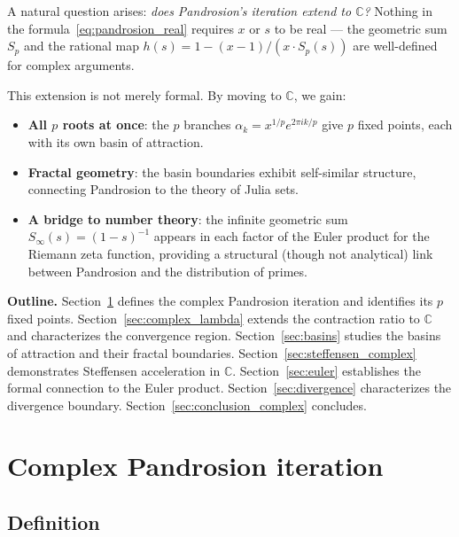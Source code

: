 \documentclass[11pt,a4paper]{article}
\theoremstyle{definition}
\newcommand{\CC}{\mathbb{C}}
\begin{document}
\medskip

A natural question arises: \emph{does Pandrosion's iteration extend to $\CC$?}  Nothing in the formula~\eqref{eq:pandrosion_real} requires $x$ or $s$ to be real --- the geometric sum $S_p$ and the rational map $h(s) = 1 - (x-1)/(x \cdot S_p(s))$ are well-defined for complex arguments.

\medskip

This extension is not merely formal.  By moving to $\CC$, we gain:
\begin{itemize}
  \item \textbf{All $p$ roots at once}: the $p$ branches $\alpha_k = x^{1/p} e^{2\pi ik/p}$ give $p$ fixed points, each with its own basin of attraction.
  \item \textbf{Fractal geometry}: the basin boundaries exhibit self-similar structure, connecting Pandrosion to the theory of Julia sets.
  \item \textbf{A bridge to number theory}: the infinite geometric sum $S_\infty(s) = (1-s)^{-1}$ appears in each factor of the Euler product for the Riemann zeta function, providing a structural (though not analytical) link between Pandrosion and the distribution of primes.
\end{itemize}

\medskip

\textbf{Outline.}
Section~\ref{sec:complex_iteration} defines the complex Pandrosion iteration and identifies its $p$ fixed points.
Section~\ref{sec:complex_lambda} extends the contraction ratio to $\CC$ and characterizes the convergence region.
Section~\ref{sec:basins} studies the basins of attraction and their fractal boundaries.
Section~\ref{sec:steffensen_complex} demonstrates Steffensen acceleration in $\CC$.
Section~\ref{sec:euler} establishes the formal connection to the Euler product.
Section~\ref{sec:divergence} characterizes the divergence boundary.
Section~\ref{sec:conclusion_complex} concludes.

\section{Complex Pandrosion iteration}
\label{sec:complex_iteration}

\subsection{Definition}
\end{document}

